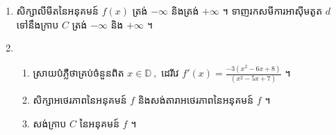 \documentclass{officialexam}
\begin{document}
\begin{enumerate}[I]
\begin{enumerate}[1]
  		\item សិក្សាលីមីតនៃអនុគមន៍ $f(x)$ ត្រង់ $-\infty$ និងត្រង់ $+\infty$ ។ ទាញរកសមីការអាស៊ីមតូត $d$ ទៅនឹងក្រាប $C$ ត្រង់ $-\infty$ និង $+\infty$ ។
  		\item \begin{enumerate}[k]
  			\item ស្រាយបំភ្លឺថាគ្រប់ចំនួនពិត $x\in\mathbb{D}~,$ ដេរីវេ $f'(x)=\frac{-3\left(x^2-6x+8\right)}{\left(x^2-5x+7\right)}$ ។
  			\item សិក្សាអថេរភាពនៃអនុគមន៍ $f$ និងសង់តារាអថេរភាពនៃអនុគមន៍ $f$ ។
  			\item សង់ក្រាប $C$ នៃអនុគមន៍ $f$ ។
  		\end{enumerate}
  	\end{enumerate}
  \end{enumerate}
\newpage
 {\maketitle}
  \begin{center}
  \end{center}
  
\end{document}
